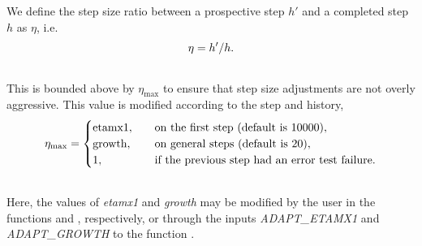 \documentclass[letterpaper,10pt,english]{sphinxmanual}
\begin{document}
We define the step size ratio between a prospective step $h'$
and a completed step $h$ as $\eta$, i.e.
\begin{gather}
\begin{split}\eta = h' / h.\end{split}\notag\\\begin{split}\end{split}\notag
\end{gather}
This is bounded above by $\eta_\text{max}$ to ensure that step size
adjustments are not overly aggressive.  This value is modified
according to the step and history,
\begin{gather}
\begin{split}\eta_\text{max} = \begin{cases}
  \text{etamx1}, & \quad\text{on the first step (default is 10000)}, \\
  \text{growth}, & \quad\text{on general steps (default is 20)}, \\
  1, & \quad\text{if the previous step had an error test failure}.
\end{cases}\end{split}\notag\\\begin{split}\end{split}\notag
\end{gather}
Here, the values of \emph{etamx1} and \emph{growth} may be modified by the user
in the functions {\hyperref[c_interface/User_callable:ARKodeSetMaxFirstGrowth]{}} and
{\hyperref[c_interface/User_callable:ARKodeSetMaxGrowth]{}}, respectively, or through the inputs
\emph{ADAPT\_ETAMX1} and \emph{ADAPT\_GROWTH} to the function
{\hyperref[f_interface/Usage:f/_/FARKSETRIN]{}}.
\end{document}
